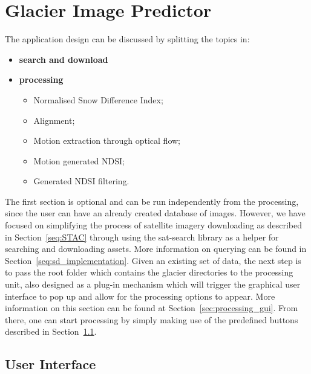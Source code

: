\documentclass[12pt, a4paper]{report}
\begin{document}
	\vfill

	\newpage{}
	\chapter{Glacier Image Predictor}
	\label{cha:design_and_implementation}
	
	\par The application design can be discussed by splitting the topics in:
	
	\begin{itemize}
		\item \textbf{search and download}
		\item \textbf{processing}
		\begin{itemize}
			\item Normalised Snow Difference Index;
			\item Alignment;
			\item Motion extraction through optical flow;
			\item Motion generated NDSI;
			\item Generated NDSI filtering.
		\end{itemize}
	\end{itemize}

	\par The first section is optional and can be run independently from the processing, since the user can have an already created database of images. However, we have focused on simplifying the process of satellite imagery downloading as described in Section~\ref{seq:STAC} through using the sat-search library as a helper for searching and downloading assets. More information on querying can be found in Section~\ref{seq:sd_implementation}. 
	Given an existing set of data, the next step is to pass the root folder which contains the glacier directories to the processing unit, also designed as a plug-in mechanism which will trigger the graphical user interface to pop up and allow for the processing options to appear. More information on this section can be found at Section~\ref{sec:processing_gui}. From there, one can start processing by simply making use of the predefined buttons described in Section~\ref{seq:gui}.
	
	\section{User Interface}
	\label{seq:gui}
	
\end{document}
